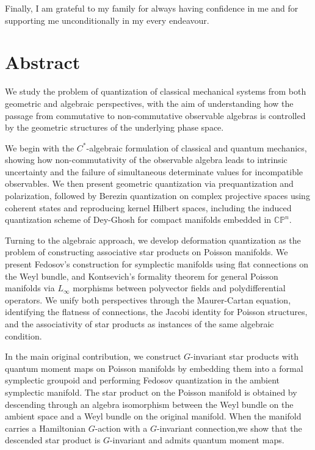\documentclass[
  12pt,
  a4paper, oneside
]{report}
\theoremstyle{bolddef}
\theoremstyle{remark}
\numberwithin{equation}{chapter}
\begin{document}
Finally, I am grateful to my family for always having confidence in me and for supporting me unconditionally in my every endeavour.

\vspace{1em}


\clearpage



\renewcommand{\cftchapleader}{\cftdotfill{\cftdotsep}} 

\chapter*{Abstract}
We study the problem of quantization of classical mechanical systems from both geometric and algebraic perspectives, with the aim of understanding how the passage from commutative to non-commutative observable algebras is controlled by the geometric structures of the underlying phase space.

We begin with the $C^*$-algebraic formulation of classical and quantum mechanics, showing how non-commutativity of the observable algebra leads to intrinsic uncertainty and the failure of simultaneous determinate values for incompatible observables. We then present geometric quantization via prequantization and polarization, followed by Berezin quantization on complex projective spaces using coherent states and reproducing kernel Hilbert spaces, including the induced quantization scheme of Dey-Ghosh for compact manifolds embedded in $\mathbb{CP}^n$.

Turning to the algebraic approach, we develop deformation quantization as the problem of constructing associative star products on Poisson manifolds. We present Fedosov's construction for symplectic manifolds using flat connections on the Weyl bundle, and Kontsevich's formality theorem for general Poisson manifolds via $L_\infty$ morphisms between polyvector fields and polydifferential operators. We unify both perspectives through the Maurer-Cartan equation, identifying the flatness of connections, the Jacobi identity for Poisson structures, and the associativity of star products as instances of the same algebraic condition.

In the main original contribution, we construct $G$-invariant star products with quantum moment maps on Poisson manifolds by embedding them into a formal symplectic groupoid and performing Fedosov quantization in the ambient symplectic manifold. The star product on the Poisson manifold is obtained by descending through an algebra isomorphism between the Weyl bundle on the ambient space and a Weyl bundle on the original manifold. When the manifold carries a Hamiltonian $G$-action with a $G$-invariant connection,we show that the descended star product is $G$-invariant and admits quantum moment maps.
\end{document}

